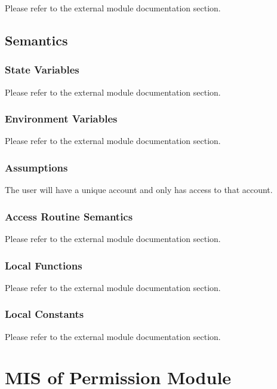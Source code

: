 \documentclass[12pt, titlepage]{article}
\begin{document}
Please refer to the external module documentation section.

\subsection{Semantics}

\subsubsection{State Variables}

Please refer to the external module documentation section.

\subsubsection{Environment Variables}

Please refer to the external module documentation section.

\subsubsection{Assumptions}

The user will have a unique account and only has access to that account.

\subsubsection{Access Routine Semantics}

Please refer to the external module documentation section.

\subsubsection{Local Functions}

Please refer to the external module documentation section.

\subsubsection{Local Constants}

Please refer to the external module documentation section.

\newpage

\section{MIS of Permission Module} \label{mPerm}
\end{document}
